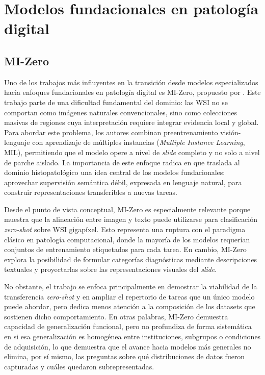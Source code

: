 \section{Modelos fundacionales en patología digital}

\subsection{MI-Zero}

Uno de los trabajos más influyentes en la transición desde modelos especializados hacia enfoques fundacionales en patología digital es MI-Zero, propuesto por \textcite{lu2023visuallanguagepretrainedmultiple}. Este trabajo parte de una dificultad fundamental del dominio: las WSI no se comportan como imágenes naturales convencionales, sino como colecciones masivas de regiones cuya interpretación requiere integrar evidencia local y global. Para abordar este problema, los autores combinan preentrenamiento visión-lenguaje con aprendizaje de múltiples instancias (\textit{Multiple Instance Learning}, MIL), permitiendo que el modelo opere a nivel de \textit{slide} completo y no solo a nivel de parche aislado. La importancia de este enfoque radica en que traslada al dominio histopatológico una idea central de los modelos fundacionales: aprovechar supervisión semántica débil, expresada en lenguaje natural, para construir representaciones transferibles a nuevas tareas.

Desde el punto de vista conceptual, MI-Zero es especialmente relevante porque muestra que la alineación entre imagen y texto puede utilizarse para clasificación \textit{zero-shot} sobre WSI gigapíxel. Esto representa una ruptura con el paradigma clásico en patología computacional, donde la mayoría de los modelos requerían conjuntos de entrenamiento etiquetados para cada tarea. En cambio, MI-Zero explora la posibilidad de formular categorías diagnósticas mediante descripciones textuales y proyectarlas sobre las representaciones visuales del \textit{slide}.

No obstante, el trabajo se enfoca principalmente en demostrar la viabilidad de la transferencia \textit{zero-shot} y en ampliar el repertorio de tareas que un único modelo puede abordar, pero dedica menos atención a la composición de los datasets que sostienen dicho comportamiento. En otras palabras, MI-Zero demuestra capacidad de generalización funcional, pero no profundiza de forma sistemática en si esa generalización es homogénea entre instituciones, subgrupos o condiciones de adquisición, lo que demuestra que el avance hacia modelos más generales no elimina, por sí mismo, las preguntas sobre qué distribuciones de datos fueron capturadas y cuáles quedaron subrepresentadas.

